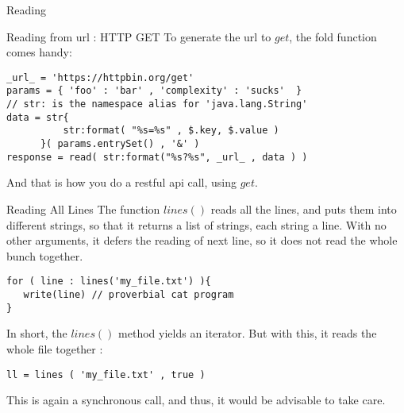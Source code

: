 \begin{section}{Reading}
\begin{subsection}{Reading from url : HTTP GET}
To generate the url to $get$, the fold function comes handy:
\begin{lstlisting}[style=JexlStyle]
_url_ = 'https://httpbin.org/get'
params = { 'foo' : 'bar' , 'complexity' : 'sucks'  }
// str: is the namespace alias for 'java.lang.String'
data = str{  
          str:format( "%s=%s" , $.key, $.value )  
      }( params.entrySet() , '&' )
response = read( str:format("%s?%s", _url_ , data ) )
\end{lstlisting}
And that is how you do a restful api call, using $get$.
\end{subsection}

\begin{subsection}{Reading All Lines}
The function $lines()$ reads all the lines, 
and puts them into different strings, so that it returns 
a list of strings, each string a line.
With no other arguments, it defers the reading of next line, 
so it does not read the whole bunch together.

\begin{lstlisting}[style=JexlStyle]
for ( line : lines('my_file.txt') ){
   write(line) // proverbial cat program 
}
\end{lstlisting}
In short, the $lines()$ method yields an iterator.
But with this, it reads the whole file together :

\begin{lstlisting}[style=JexlStyle]
ll = lines ( 'my_file.txt' , true )
\end{lstlisting}

This is again a synchronous call, and thus, it would 
be advisable to take care.

\end{subsection}

\end{section}

